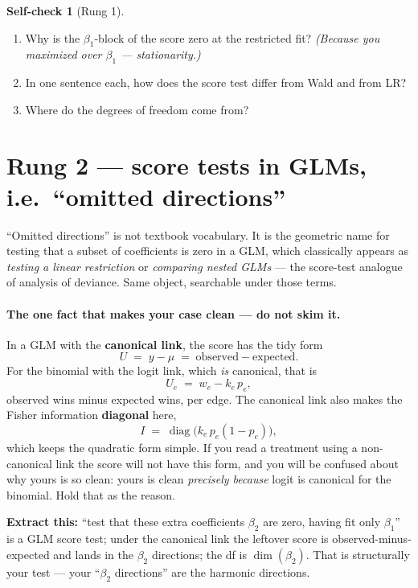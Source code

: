 \documentclass[11pt,a4paper]{article}
\theoremstyle{definition}
\newtheorem*{selfcheck}{Self-check}
\begin{document}
\begin{selfcheck}[Rung 1]
\begin{enumerate}[leftmargin=1.6em,itemsep=0.2em,topsep=0.3em]
\item Why is the $\beta_1$-block of the score zero at the restricted fit?
  \emph{(Because you maximized over $\beta_1$ --- stationarity.)}
\item In one sentence each, how does the score test differ from Wald and from LR?
\item Where do the degrees of freedom come from?
\end{enumerate}
\end{selfcheck}

\section{Rung 2 --- score tests in GLMs, i.e.\ ``omitted directions''}

``Omitted directions'' is not textbook vocabulary. It is the geometric name for
testing that a subset of coefficients is zero in a GLM, which classically appears
as \emph{testing a linear restriction} or \emph{comparing nested GLMs} --- the
score-test analogue of analysis of deviance. Same object, searchable under those
terms.

\paragraph{The one fact that makes your case clean --- do not skim it.}
In a GLM with the \textbf{canonical link}, the score has the tidy form
\[
  U \;=\; y-\mu \;=\; \text{observed} - \text{expected}.
\]
For the binomial with the logit link, which \emph{is} canonical, that is
\[
  U_e \;=\; w_e - k_e\,p_e,
\]
observed wins minus expected wins, per edge. The canonical link also makes the
Fisher information \textbf{diagonal} here,
\[
  I \;=\; \operatorname{diag}\!\big(k_e\,p_e(1-p_e)\big),
\]
which keeps the quadratic form simple. If you read a treatment using a
non-canonical link the score will not have this form, and you will be confused
about why yours is so clean: yours is clean \emph{precisely because} logit is
canonical for the binomial. Hold that as the reason.

\medskip
\noindent\textbf{Extract this:} ``test that these extra coefficients $\beta_2$
are zero, having fit only $\beta_1$'' is a GLM score test; under the canonical
link the leftover score is observed-minus-expected and lands in the $\beta_2$
directions; the df is $\dim(\beta_2)$. That is structurally your test --- your
``$\beta_2$ directions'' are the harmonic directions.
\end{document}
